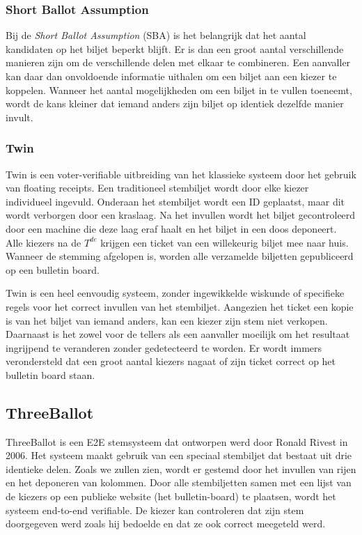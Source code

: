 \subsubsection{Short Ballot Assumption}

Bij de \textit{Short Ballot Assumption} (SBA) is het belangrijk dat het aantal kandidaten op het biljet beperkt blijft. Er is dan een groot aantal verschillende manieren zijn om de verschillende delen met elkaar te combineren. Een aanvaller kan daar dan onvoldoende informatie uithalen om een biljet aan een kiezer te koppelen. Wanneer het aantal mogelijkheden om een biljet in te vullen toeneemt, wordt de kans kleiner dat iemand anders zijn biljet op identiek dezelfde manier invult.\cite{cichon_kutylowski_weglorz_short_ballot_assumption}

\subsubsection{Twin}
\label{sec:ls:twin}

Twin is een voter-verifiable uitbreiding van het klassieke systeem door het gebruik van floating receipts.\cite{rivest_smith_three_voting_protocols} Een traditioneel stembiljet wordt door elke kiezer individueel ingevuld. Onderaan het stembiljet wordt een ID geplaatst, maar dit wordt verborgen door een kraslaag. Na het invullen wordt het biljet gecontroleerd door een machine die deze laag eraf haalt en het biljet in een doos deponeert. Alle kiezers na de $T^{de}$ krijgen een ticket van een willekeurig biljet mee naar huis. Wanneer de stemming afgelopen is, worden alle verzamelde biljetten gepubliceerd op een bulletin board.

\npar Twin is een heel eenvoudig systeem, zonder ingewikkelde wiskunde of specifieke regels voor het correct invullen van het stembiljet. Aangezien het ticket een kopie is van het biljet van iemand anders, kan een kiezer zijn stem niet verkopen. Daarnaast is het zowel voor de tellers als een aanvaller moeilijk om het resultaat ingrijpend te veranderen zonder gedetecteerd te worden. Er wordt immers verondersteld dat een groot aantal kiezers nagaat of zijn ticket correct op het bulletin board staan.

\subsection{ThreeBallot}
\label{sec:ls:threeballot}

ThreeBallot\cite{rivest_threeballot} is een E2E stemsysteem dat ontworpen werd door Ronald Rivest in 2006. Het systeem maakt gebruik van een speciaal stembiljet dat bestaat uit drie identieke delen. Zoals we zullen zien, wordt er gestemd door het invullen van rijen en het deponeren van kolommen. Door alle stembiljetten samen met een lijst van de kiezers op een publieke website (het bulletin-board) te plaatsen, wordt het systeem end-to-end verifiable. De kiezer kan controleren dat zijn stem doorgegeven werd zoals hij bedoelde en dat ze ook correct meegeteld werd.

